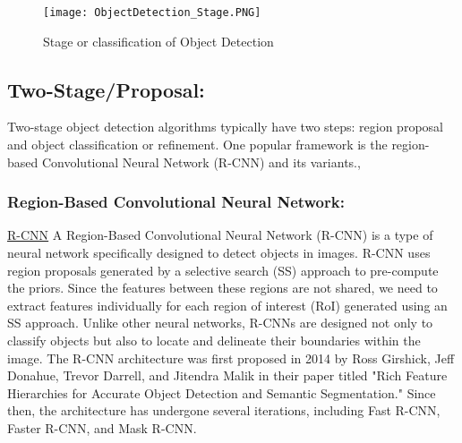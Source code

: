 \begin{figure}[H]
    \centering
    \texttt{[image: ObjectDetection\_Stage.PNG]}
    \caption{Stage  or classification of Object Detection}
    \label{fig: Stage of Object Detection}
\end{figure}

\subsection{Two-Stage/Proposal: }
  Two-stage object detection algorithms typically have two steps: region proposal and object classification or refinement. One popular framework is the region-based Convolutional Neural Network (R-CNN) and its variants.\cite{du2020overview}, \cite{ansari2020building}
\subsubsection{Region-Based Convolutional Neural Network: } \underline{\textcolor{blue}{\href{https://arxiv.org/pdf/1311.2524.pdf}{R-CNN}}}
A Region-Based Convolutional Neural Network (R-CNN) is a type of neural network specifically designed to detect objects in images. R-CNN uses region proposals generated by a selective search (SS) approach to pre-compute the priors. Since the features between these regions are not shared, we need to extract features individually for each region of interest (RoI) generated using an SS approach. Unlike other neural networks, R-CNNs are designed not only to classify objects but also to locate and delineate their boundaries within the image.
The R-CNN architecture was first proposed in 2014 by Ross Girshick, Jeff Donahue, Trevor Darrell, and Jitendra Malik in their paper titled "Rich Feature Hierarchies for Accurate Object Detection and Semantic Segmentation." Since then, the architecture has undergone several iterations, including Fast R-CNN, Faster R-CNN, and Mask R-CNN.
        
